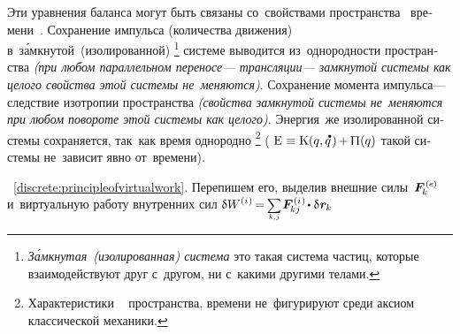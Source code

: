 

\begin{otherlanguage}{russian}

Эти уравнения баланса
могут быть связаны
со~свойствами
пространства
~времени~\cite{landau.lifshitz-shortcourse}.
Сохранение импульса
(количества движения)
в~з\'{а}мкнутой~(изолированной)%
\footnote{\emph{З\'{а}мкнутая~(изолированная) система}
это такая система частиц,
которые
взаимодействуют
друг с~другом,
ни с~какими другими телами.}\hspace{-0.25ex}
системе выводится из~однородности пространства \emph{(при любом параллельном переносе\:--- трансляции\:--- замкнутой системы как целого свойства этой системы не~меняются)}.
Сохранение момента импульса\:--- следствие изотропии пространства \emph{(свойства замкнутой системы не~меняются при любом повороте этой системы как целого)}.
Энергия~же
изолированной системы
сохраняется,
так~как
время однородно%
%
\footnote{%
Характеристики
~
пространства,
времени
не~фигурируют среди аксиом
классической механики.
}\hspace{-0.25ex} %
(
${\mathrm{E} \hspace{.1ex} \equiv \kineticenergyinmechanics \hspace{.1ex} (q, \mathdotabove{q} \hspace{.2ex}) \hspace{-0.2ex} + \hspace{-0.1ex} \potentialenergyinmechanics (q)}$
такой системы
не~зависит явно от~времени).

~\eqref{discrete:principleofvirtualwork}.
Перепишем его,
выделив
внешние силы~${\bm{F}^{\smthexternal}_{\hspace{-0.16ex}k}}$
и~виртуальную работу
внутренних сил
${\variation{\internalwork} \hspace{-0.1ex} = \hspace{-0.2ex} \scalebox{.8}{$ \displaystyle \underset{\raisemath{.25ex}{\smash{k,\hspace{.1ex}j}}}{\sum} $} \hspace{.2ex} \bm{F}^{\smthinternal}_{\hspace{-0.16ex}kj} \hspace{-0.1ex} \dotp \variation{\hspace{.1ex}\locationvector_{\hspace{-0.1ex}k}} \hspace{.1ex}}$


\end{otherlanguage}
